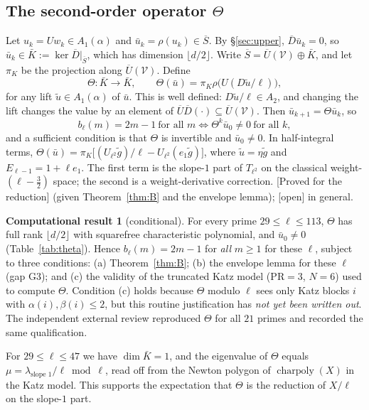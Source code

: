 \documentclass[11pt]{amsart}
\newcommand{\Sb}{\overline{S}}
\newcommand{\Ub}{\overline{U}}
\newcommand{\Db}{\overline{D}}
\newcommand{\cV}{\mathcal{V}}
\DeclareMathOperator{\charpoly}{charpoly}
\newcommand{\st}[1]{\textup{\textsf{[#1]}}}
\theoremstyle{plain}
\theoremstyle{definition}
\newtheorem{computation}[theorem]{Computational result}
\numberwithin{equation}{section}
\begin{document}
\subsection{The second-order operator $\Theta$}\label{sec:theta}
Let $u_k=Uw_k\in A_1(\alpha)$ and $\bar u_k=\rho(u_k)\in\Sb$. By \S\ref{sec:upper}, $\Db\bar u_k=0$, so
$\bar u_k\in\bar K:=\ker\Db|_{\Sb}$, which has dimension $\lfloor d/2\rfloor$. Write $\Sb=\Ub(\cV)\oplus\bar K$, and let $\pi_K$ be
the projection along $\Ub(\cV)$. Define
\[
  \Theta:\bar K\to\bar K,\qquad\Theta(\bar u)=\pi_K\rho\big(U(D\tilde u/\ell)\big),
\]
for any lift $\tilde u\in A_1(\alpha)$ of $\bar u$. This is well defined: $D\tilde u/\ell\in A_2$, and changing the lift changes the
value by an element of $\Ub\Db(\cdot)\subseteq\Ub(\cV)$. Then $\bar u_{k+1}=\Theta\bar u_k$, so
\[
  b_\ell(m)=2m-1\ \text{for all }m\iff\Theta^k\bar u_0\ne0\ \text{for all }k,
\]
and a sufficient condition is that $\Theta$ is invertible and $\bar u_0\ne0$. In half-integral terms,
$\Theta(\bar u)=\pi_K\big[(U_{\ell^2}\tilde g)/\ell-U_{\ell^2}(e_1\tilde g)\big]$, where $\tilde u=\eta\tilde g$ and $E_{\ell-1}=1+\ell e_1$.
The first term is the slope-$1$ part of $T_{\ell^2}$ on the classical weight-$(\ell-\frac32)$ space; the second is a
weight-derivative correction. \st{Proved for the reduction} (given Theorem~\ref{thm:B} and the envelope lemma);
\st{open} in general.

\begin{computation}[conditional]\label{comp:theta}
For every prime $29\le\ell\le113$, $\Theta$ has full rank $\lfloor d/2\rfloor$ with squarefree characteristic polynomial, and
$\bar u_0\ne0$ (Table~\ref{tab:theta}). Hence $b_\ell(m)=2m-1$ for \emph{all} $m\ge1$ for these $\ell$, subject to three
conditions: (a) Theorem~\ref{thm:B}; (b) the envelope lemma for these $\ell$ (gap G3); and (c) the validity of the truncated Katz
model ($\mathrm{PR}=3$, $N=6$) used to compute $\Theta$. Condition (c) holds because $\Theta$ modulo $\ell$ sees only Katz
blocks $i$ with $\alpha(i),\beta(i)\le2$, but this routine justification has \emph{not yet been written out}. The
independent external review reproduced $\Theta$ for all $21$ primes and recorded the same qualification.
\end{computation}

For $29\le\ell\le47$ we have $\dim\bar K=1$, and the eigenvalue of $\Theta$ equals $\mu=\lambda_{\text{slope }1}/\ell\bmod\ell$, read off
from the Newton polygon of $\charpoly(X)$ in the Katz model. This supports the expectation that $\Theta$ is the reduction of $X/\ell$
on the slope-$1$ part.
\end{document}
